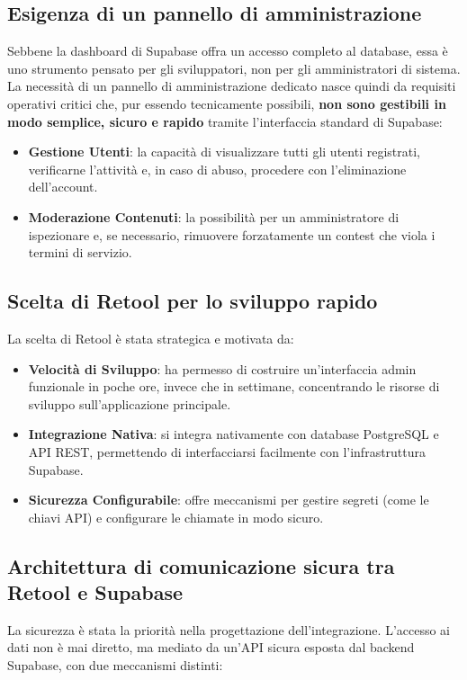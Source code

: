\subsection{Esigenza di un pannello di amministrazione}\label{subsec:esigenza-di-un-pannello-di-amministrazione}
Sebbene la dashboard di Supabase offra un accesso completo al database, essa è uno strumento pensato per gli sviluppatori, non per gli amministratori di sistema.
La necessità di un pannello di amministrazione dedicato nasce quindi da requisiti operativi critici che, pur essendo tecnicamente possibili, \textbf{non sono gestibili in modo semplice, sicuro e rapido} tramite l'interfaccia standard di Supabase:
\begin{itemize}
    \item \textbf{Gestione Utenti}: la capacità di visualizzare tutti gli utenti registrati, verificarne l'attività e, in caso di abuso, procedere con l'eliminazione dell'account.
    \item \textbf{Moderazione Contenuti}: la possibilità per un amministratore di ispezionare e, se necessario, rimuovere forzatamente un contest che viola i termini di servizio.
\end{itemize}

\subsection{Scelta di Retool per lo sviluppo rapido}\label{subsec:scelta-di-retool-per-lo-sviluppo-rapido}
La scelta di Retool è stata strategica e motivata da:
\begin{itemize}
    \item \textbf{Velocità di Sviluppo}: ha permesso di costruire un'interfaccia admin funzionale in poche ore, invece che in settimane, concentrando le risorse di sviluppo sull'applicazione principale.
    \item \textbf{Integrazione Nativa}: si integra nativamente con database PostgreSQL e API REST, permettendo di interfacciarsi facilmente con l'infrastruttura Supabase.
    \item \textbf{Sicurezza Configurabile}: offre meccanismi per gestire segreti (come le chiavi API) e configurare le chiamate in modo sicuro.
\end{itemize}

\subsection{Architettura di comunicazione sicura tra Retool e Supabase}\label{subsec:architettura-di-comunicazione-sicura-tra-retool-e-supabase}
La sicurezza è stata la priorità nella progettazione dell'integrazione.
L'accesso ai dati non è mai diretto, ma mediato da un'API sicura esposta dal backend Supabase, con due meccanismi distinti:

